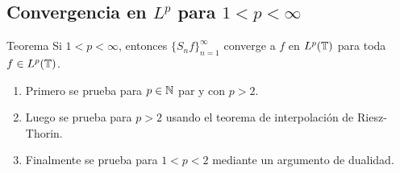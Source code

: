\documentclass{beamer}
\begin{document}
\subsection{Convergencia en \texorpdfstring{$L^p$}{Lp} para \texorpdfstring{$1<p<\infty$}{1<p<oo}}

\begin{frame}
    \begin{block}{Teorema}
        Si $1 < p < \infty$, entonces $\{S_nf\}_{n=1}^\infty$ converge a $f$ en $L^p(\mathbb T)$ para toda $f \in L^p(\mathbb T)$.
    \end{block}
    \begin{enumerate}
        \pause
        \item Primero se prueba para $p \in \mathbb N$ par y con $p > 2$.
        \pause
        \item Luego se prueba para $p > 2$ usando el teorema de interpolación de Riesz-Thorin.
        \pause
        \item Finalmente se prueba para $1 < p < 2$ mediante un argumento de dualidad.
    \end{enumerate}
\end{frame}
\end{document}
